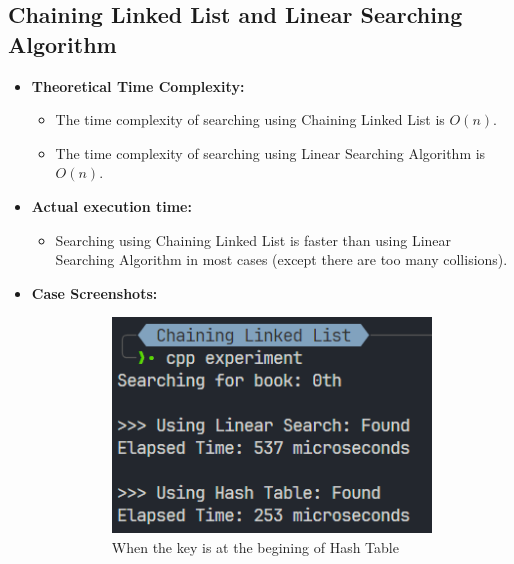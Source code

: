\pagebreak
\subsection{Chaining Linked List and Linear Searching Algorithm}
\begin{itemize}
	\item \textbf{Theoretical Time Complexity:}
	      \begin{itemize}
		      \item The time complexity of searching using Chaining Linked List is \(O(n)\).
		      \item The time complexity of searching using Linear Searching Algorithm is \(O(n)\).
	      \end{itemize}
	\item \textbf{Actual execution time:}
	      \begin{itemize}
		      \item Searching using Chaining Linked List is faster than using Linear Searching Algorithm in most cases (except there are too many collisions).
	      \end{itemize}
	\item \textbf{Case Screenshots:}
	      \begin{figure}[!ht]
		      \centering
		      \begin{subfigure}{0.45\textwidth}
			      \centering
			      \includegraphics[width=\textwidth]{imgs/Chaining Linked List/beg.png}
			      \caption{When the key is at the begining of Hash Table}\label{fig:chainingll-beg-metric}
		      \end{subfigure}
		      \hfill
		      \begin{subfigure}{0.45\textwidth}

\end{subfigure}
\end{figure}
\end{itemize}
